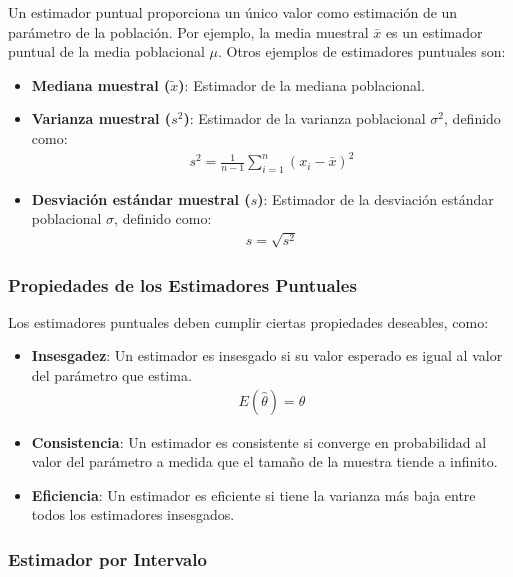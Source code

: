 Un estimador puntual proporciona un \'unico valor como estimaci\'on de un par\'ametro de la poblaci\'on. Por ejemplo, la media muestral $\bar{x}$ es un estimador puntual de la media poblacional $\mu$. Otros ejemplos de estimadores puntuales son:

\begin{itemize}
    \item \textbf{Mediana muestral ($\tilde{x}$)}: Estimador de la mediana poblacional.
    \item \textbf{Varianza muestral ($s^2$)}: Estimador de la varianza poblacional $\sigma^2$, definido como:
    \begin{eqnarray*}
    s^2 = \frac{1}{n-1} \sum_{i=1}^{n} (x_i - \bar{x})^2
    \end{eqnarray*}
    \item \textbf{Desviaci\'on est\'andar muestral ($s$)}: Estimador de la desviaci\'on est\'andar poblacional $\sigma$, definido como:
    \begin{eqnarray*}
    s = \sqrt{s^2}
    \end{eqnarray*}
\end{itemize}

\subsubsection{Propiedades de los Estimadores Puntuales}

Los estimadores puntuales deben cumplir ciertas propiedades deseables, como:

\begin{itemize}
    \item \textbf{Insesgadez}: Un estimador es insesgado si su valor esperado es igual al valor del par\'ametro que estima.
    \begin{eqnarray*}
    E(\hat{\theta}) = \theta
    \end{eqnarray*}
    \item \textbf{Consistencia}: Un estimador es consistente si converge en probabilidad al valor del par\'ametro a medida que el tama\~no de la muestra tiende a infinito.
    \item \textbf{Eficiencia}: Un estimador es eficiente si tiene la varianza m\'as baja entre todos los estimadores insesgados.
\end{itemize}

\subsubsection{Estimador por Intervalo}


